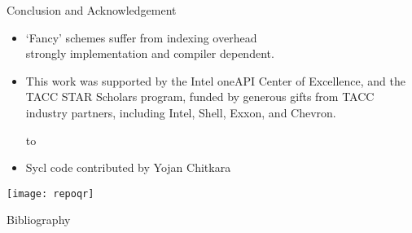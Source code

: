 \documentclass[10pt]{beamer}
\begin{document}
\begin{comment}
  \begin{numberedframe}{Can we use execution policies?}
    \begin{itemize}
    \item Last time I tried there was a compiler issue
    \item That 5-point stencil is hard to express in range views!
    \end{itemize}
  \end{numberedframe}
\end{comment}

\begin{numberedframe}{Conclusion and Acknowledgement}
  \begin{itemize}
  \item `Fancy' schemes suffer from indexing overhead\\
    strongly implementation and compiler dependent.
  \item This work was supported by
    the Intel oneAPI Center of Excellence, and the 
    TACC STAR Scholars program,
    funded by generous gifts from TACC industry partners, including Intel, Shell, Exxon,
    and Chevron.\par
  \hbox to 
  \item Sycl code contributed by Yojan Chitkara
  \end{itemize}
  \texttt{[image: repoqr]}
\end{numberedframe}

\begin{numberedframe}{Bibliography}
  
  
\end{numberedframe}
\end{document}
